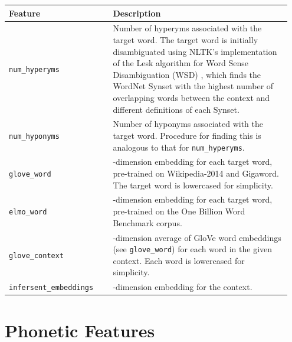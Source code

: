 \documentclass{dcthesis}
\theoremstyle{definition}
\theoremstyle{remark}
\begin{document}
\begin{table}[H]
  \centering
  \begin{tabular}{>{\centering\arraybackslash}p{0.35\linewidth}>{\arraybackslash}p{0.6\linewidth}}
    \textbf{Feature} & \textbf{Description} \\ \hline  
    \texttt{num\_hyperyms} & Number of hyperyms associated with the target word. The target word is initially disambiguated using NLTK's implementation of the Lesk algorithm for Word Sense Disambiguation (WSD) \citep{lesk1986automatic}, which finds the WordNet Synset with the highest number of overlapping words between the context and different definitions of each Synset.\\
    \hline 
    \texttt{num\_hyponyms} & Number of hyponyms associated with the target word. Procedure for finding this is analogous to that for \texttt{num\_hyperyms}.\\
    \hline 
    \texttt{glove\_word} & 300-dimension embedding for each target word, pre-trained on Wikipedia-2014 and Gigaword. The target word is lowercased for simplicity.\\
    \hline 
    \texttt{elmo\_word} & 1024-dimension embedding for each target word, pre-trained on the One Billion Word Benchmark corpus.\\
    \hline 
    \texttt{glove\_context} & 300-dimension average of GloVe word embeddings (see \texttt{glove\_word}) for each word in the given context. Each word is lowercased for simplicity.\\
    \hline 
    \texttt{infersent\_embeddings} & 4096-dimension embedding for the context.\\
  \end{tabular}
  \label{semantic_features}
\end{table}

\section{Phonetic Features}
\end{document}
